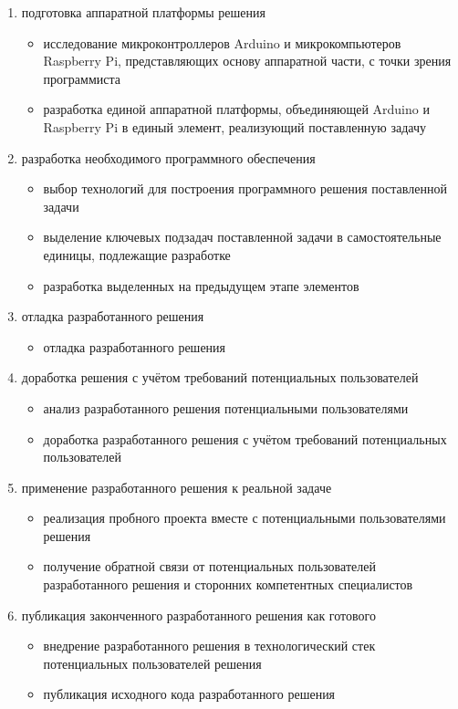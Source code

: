 \begin{enumerate}
\item подготовка аппаратной платформы решения 
\begin{itemize}
    \item исследование микроконтроллеров Arduino и микрокомпьютеров Raspberry Pi, представляющих основу аппаратной части, с точки зрения программиста
    \item разработка единой аппаратной платформы, объединяющей Arduino и Raspberry Pi в единый элемент, реализующий поставленную задачу
\end{itemize}

\item разработка необходимого программного обеспечения
\begin{itemize}
    \item выбор технологий для построения программного решения поставленной задачи
    \item выделение ключевых подзадач поставленной задачи в самостоятельные единицы, подлежащие разработке
    \item разработка выделенных на предыдущем этапе элементов
\end{itemize}

\item отладка разработанного решения
\begin{itemize}
    \item отладка разработанного решения
\end{itemize}

\item доработка решения с учётом требований потенциальных пользователей
\begin{itemize}
    \item анализ разработанного решения потенциальными пользователями
    \item доработка разработанного решения с учётом требований потенциальных пользователей
\end{itemize}

\item применение разработанного решения к реальной задаче  
\begin{itemize}
    \item реализация пробного проекта вместе с потенциальными пользователями решения
    \item получение обратной связи от потенциальных пользователей разработанного решения и сторонних компетентных специалистов
\end{itemize}

\item публикация законченного разработанного решения как готового
\begin{itemize}
    \item внедрение разработанного решения в технологический стек потенциальных пользователей решения
    \item публикация исходного кода разработанного решения
\end{itemize}
\end{enumerate}

